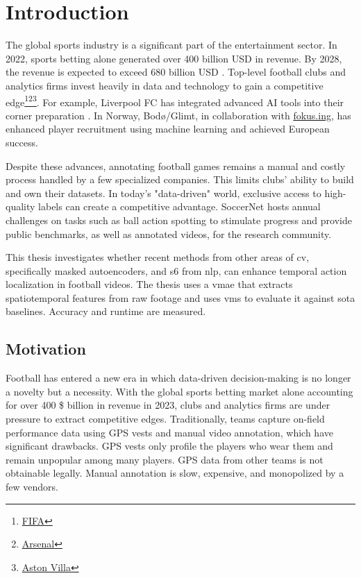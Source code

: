 \chapter{Introduction}
\label{chap:intro}

The global sports industry is a significant part of the entertainment sector. In 2022, sports betting alone generated over 400 billion USD in revenue. By 2028, the revenue is expected to exceed 680 billion USD \cite{gough_value_2024}. Top-level football clubs and analytics firms invest heavily in data and technology to gain a competitive edge\footnote{\hyperlink{https://www.linkedin.com/posts/hadisotudeh_hiring-data-architect-activity-7293916472295231488-AwiE/}{FIFA}}\footnote{\hyperlink{https://careers.arsenal.com/jobs/5434108-research-engineer}{Arsenal}}\footnote{\hyperlink{https://www.linkedin.com/posts/hadisotudeh_hiring-dataanalyst-recruitment-activity-7291477919799939072-FhMy/?utm_source=social_share_send&utm_medium=member_desktop_web}{Aston Villa}}. For example, Liverpool FC has integrated advanced AI tools into their corner preparation \cite{wang_tactic_ai_2024}. In Norway, Bodø/Glimt, in collaboration with \hyperlink{https://fokus.ing}{fokus.ing}, has enhanced player recruitment using machine learning and achieved European success.

Despite these advances, annotating football games remains a manual and costly process handled by a few specialized companies. This limits clubs' ability to build and own their datasets. In today's "data-driven" world, exclusive access to high-quality labels can create a competitive advantage. SoccerNet hosts annual challenges on tasks such as ball action spotting to stimulate progress and provide public benchmarks, as well as annotated videos, for the research community.

This thesis investigates whether recent methods from other areas of \acrfull{cv}, specifically masked autoencoders, and \acrfull{s6} from \acrfull{nlp}, can enhance temporal action localization in football videos. The thesis uses a \acrfull{vmae} that extracts spatiotemporal features from raw footage and uses \acrfull{vms} to evaluate it against \acrfull{sota} baselines. Accuracy and runtime are measured. 

\section{Motivation}
Football has entered a new era in which data-driven decision-making is no longer a novelty but a necessity. With the global sports betting market alone accounting for over 400 \$ billion in revenue in 2023, clubs and analytics firms are under pressure to extract competitive edges. Traditionally, teams capture on-field performance data using GPS vests and manual video annotation, which have significant drawbacks. GPS vests only profile the players who wear them and remain unpopular among many players. GPS data from other teams is not obtainable legally. Manual annotation is slow, expensive, and monopolized by a few vendors. 

